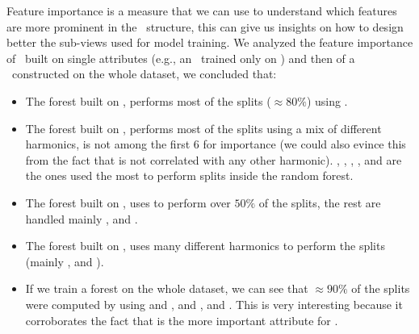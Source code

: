 Feature importance is a measure that we can use to understand which features are more prominent in
the \rf\ structure, this can give us insights on how to design better the sub-views used for model
training. We analyzed the feature importance of \rfs\ built on single attributes (e.g., an \rf\
trained only on \an) and then of a \rf\ constructed on the whole dataset, we concluded that:
\begin{itemize}
	\item The forest built on \an, performs most of the splits ($\approx 80\%$) using \an[2].
	\item The forest built on \bn, performs most of the splits using a mix of different
	      harmonics, \bn[2] is not among the first $6$ for importance (we could also evince
	      this from the fact that \bn[2] is not correlated with any other harmonic). \bn[6],
	      \bn[9], \bn[3], \bn[14], \bn[7] and \bn[5] are the ones used the most to perform splits inside the random forest.
	\item The forest built on \cnmod, uses \cnmod[2] to perform over $50\%$ of the splits, the
	      rest are handled mainly \cnmod[5], \cnmod[9] and \cnmod[13].
	\item The forest built on \phin, uses many different harmonics to perform the splits (mainly
	      \phin[10], \phin[12] and \phin[6]).
	\item If we train a forest on the whole dataset, we can see that $\approx90\%$ of the splits
	      were computed by using \cnmod[2] and \cnmod[3], and \an[12], \an[2] and \an[14].
	      This is very interesting because it corroborates the fact that \cnmod is the more
	      important attribute for \qrp.
\end{itemize}


